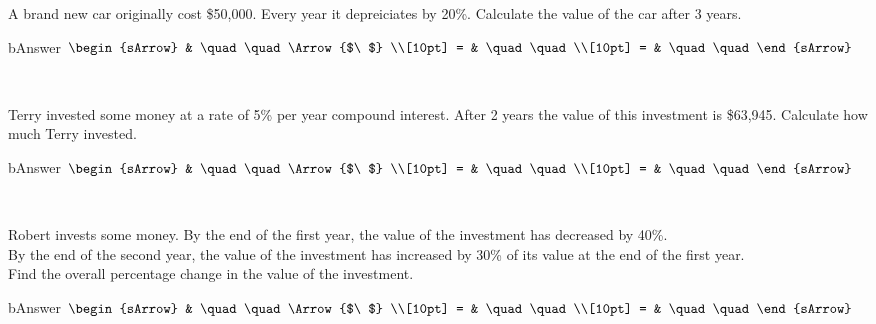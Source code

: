 \begin{mtask}[resume]
  \task A brand new car originally cost \$50,000. Every year it depreiciates by 20\%. Calculate the value of the car after 3 years.
      \begin{envOut}[height=6cm]{bAnswer}
	       $\begin{sArrow}
	             & \quad\quad       \Arrow{$\ $} \\[10pt]
               = & \quad\quad               \\[10pt]      
			   = & \quad\quad  
	        \end{sArrow}$
      \end{envOut}
	  \begin{shortsolution}  
	     $ \quad \quad \quad \quad$
 	  \end{shortsolution}
	  
\end{mtask}

\clearpage\noindent%
\begin{mtask}[resume]
  \task Terry invested some money at a rate of 5\% per year compound interest. After 2 years the value of this investment is \$63,945. Calculate how much Terry invested.
      \begin{envOut}[height=6cm]{bAnswer}
	       $\begin{sArrow}
	             & \quad\quad       \Arrow{$\ $} \\[10pt]
               = & \quad\quad               \\[10pt]      
			   = & \quad\quad  
	        \end{sArrow}$
      \end{envOut}
	  \begin{shortsolution}  
	     $ \quad \quad \quad \quad$
 	  \end{shortsolution}
	  
  \task Robert invests some money. By the end of the first year, the value of the investment has decreased by 40\%.\\ 
  By the end of the second year, the value of the investment has increased by 30\% of its value at the end of the first year. \\
  Find the overall percentage change in the value of the investment.
      \begin{envOut}[height=6cm]{bAnswer}
	       $\begin{sArrow}
	             & \quad\quad       \Arrow{$\ $} \\[10pt]
               = & \quad\quad               \\[10pt]      
			   = & \quad\quad  
	        \end{sArrow}$
      \end{envOut}
	  \begin{shortsolution}  
	     $ \quad \quad \quad \quad$
 	  \end{shortsolution}
\end{mtask}

\clearpage\noindent%
